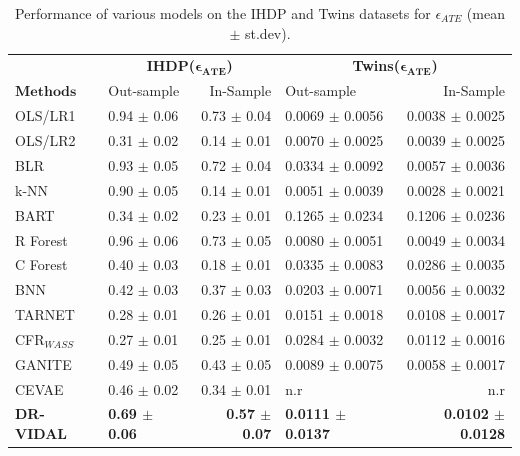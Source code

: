 \documentclass{amia}
\begin{document}
\begin{table}[h]
\fontsize{7.6pt}{0.35cm}\selectfont
\centering
\begin{tabular}{l|l r|l r}
\toprule 
      & \multicolumn{2}{c}{\textbf{IHDP($\boldsymbol{\epsilon_{ATE}}$)}} & \multicolumn{2}{|c}{\textbf{Twins($\boldsymbol{\epsilon_{ATE}}$)}} \\
      $\boldsymbol{Methods}$ & Out-sample & In-Sample
      & Out-sample & In-Sample\\
\midrule 
      OLS/LR1   & 0.94 $\pm$ 0.06 & 0.73 $\pm$ 0.04  & 0.0069 $\pm$ 0.0056 & 0.0038 $\pm$ 0.0025 \\
      OLS/LR2   & 0.31 $\pm$ 0.02 & 0.14 $\pm$ 0.01  & 0.0070 $\pm$ 0.0025 & 0.0039 $\pm$ 0.0025 \\
      BLR       & 0.93 $\pm$ 0.05 & 0.72 $\pm$ 0.04  & 0.0334 $\pm$ 0.0092 & 0.0057 $\pm$ 0.0036 \\
      k-NN      & 0.90 $\pm$ 0.05 & 0.14 $\pm$ 0.01  & 0.0051 $\pm$ 0.0039 & 0.0028 $\pm$ 0.0021 \\
\midrule 
      BART      & 0.34 $\pm$ 0.02 & 0.23 $\pm$ 0.01 & 0.1265 $\pm$ 0.0234 & 0.1206 $\pm$ 0.0236 \\
      R Forest  & 0.96 $\pm$ 0.06 & 0.73 $\pm$ 0.05 & 0.0080 $\pm$ 0.0051 & 0.0049 $\pm$ 0.0034 \\
      C Forest  & 0.40 $\pm$ 0.03 & 0.18 $\pm$ 0.01 & 0.0335 $\pm$ 0.0083 & 0.0286 $\pm$ 0.0035 \\
\midrule 
      BNN          & 0.42 $\pm$ 0.03 & 0.37 $\pm$ 0.03     & 0.0203 $\pm$ 0.0071 & 0.0056 $\pm$ 0.0032 \\
      TARNET       & 0.28 $\pm$ 0.01 & 0.26 $\pm$ 0.01   & 0.0151 $\pm$ 0.0018 & 0.0108 $\pm$ 0.0017 \\
      CFR$_{WASS}$ & 0.27 $\pm$ 0.01 & 0.25 $\pm$ 0.01    & 0.0284 $\pm$ 0.0032 & 0.0112 $\pm$ 0.0016 \\
\midrule 
      GANITE   & 0.49 $\pm$ 0.05 & 0.43 $\pm$ 0.05 & 0.0089 $\pm$ 0.0075 & 0.0058 $\pm$ 0.0017 \\
      CEVAE    & 0.46 $\pm$ 0.02 & 0.34 $\pm$ 0.01 & n.r & n.r \\
\midrule
      \textbf{DR-VIDAL}  & \textbf{0.69 $\pm$ 0.06} & \textbf{0.57 $\pm$ 0.07} 
      & \textbf{0.0111 $\pm$ 0.0137} & \textbf{0.0102 $\pm$ 0.0128} \\
\bottomrule
\end{tabular}
\caption{Performance of 
various models on the IHDP and Twins datasets for $\epsilon_{ATE}$ (mean $\pm$ st.dev).}\smallskip
\label{tab: IHDP_Twins_within}
\end{table}
\end{document}
